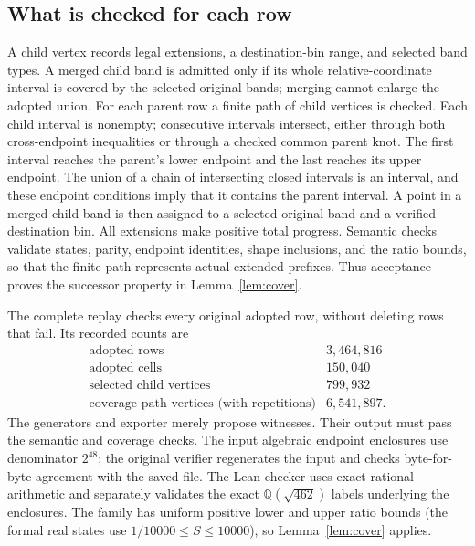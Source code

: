 \documentclass[11pt,a4paper]{article}
\newcommand{\Q}{\mathbb Q}
\begin{document}
\subsection{What is checked for each row}
A child vertex records legal extensions, a destination-bin range,
and selected band types. A merged child band is admitted only if its
whole relative-coordinate interval is covered by the selected original
bands; merging cannot enlarge the adopted union. For each parent row
a finite path of child vertices is checked. Each child interval is
nonempty; consecutive intervals intersect, either through both
cross-endpoint inequalities or through a checked common parent knot.
The first interval reaches the parent's lower endpoint and the last
reaches its upper endpoint. The union of a chain of intersecting closed
intervals is an interval, and these endpoint conditions imply that it
contains the parent interval. A point in a merged child band is then
assigned to a selected original band and a verified destination bin.
All extensions make positive total progress. Semantic checks validate
states, parity, endpoint identities, shape inclusions, and the ratio
bounds, so that the finite path represents actual extended prefixes.
Thus acceptance proves the successor property in Lemma~\ref{lem:cover}.

The complete replay checks every original adopted row, without deleting
rows that fail. Its recorded counts are
\[
\begin{array}{lr}
\text{adopted rows}&3,464,816\\
\text{adopted cells}&150,040\\
\text{selected child vertices}&799,932\\
\text{coverage-path vertices (with repetitions)}&6,541,897.
\end{array}
\]
The generators and exporter merely propose witnesses. Their output
must pass the semantic and coverage checks. The input algebraic endpoint
enclosures use denominator $2^{48}$; the original verifier regenerates
the input and checks byte-for-byte agreement with the saved file.
The Lean checker uses exact rational arithmetic and separately validates
the exact $\Q(\sqrt{462})$ labels underlying the enclosures.
The family has uniform positive lower and upper ratio bounds
(the formal real states use $1/10000\le S\le10000$), so
Lemma~\ref{lem:cover} applies.
\end{document}
